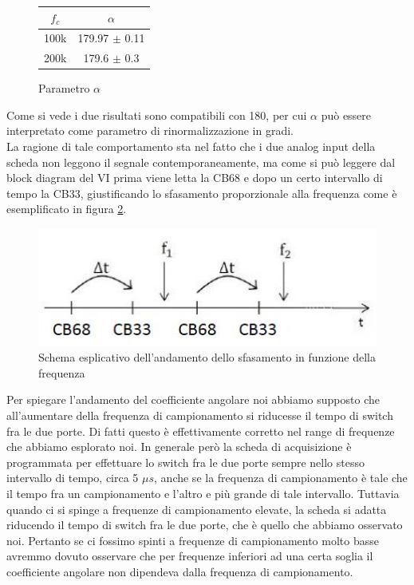 \documentclass[journal, a4paper]{IEEEtran}
\begin{document}
\begin{figure}[htp]
\centering
\caption{Parametro $\alpha$}
\begin{tabular}{|c|c|}
\hline 
$f_c$ & $\alpha$ \\ 
\hline 
100k & 179.97 $\pm$ 0.11 \\ 
\hline 
200k & 179.6 $\pm$ 0.3 \\ 
\hline 
\end{tabular} 
\label{tab:alpha}
\end{figure}

Come si vede i due risultati sono compatibili con 180, per cui $\alpha$ può essere interpretato come parametro di rinormalizzazione in gradi.\\
La ragione di tale comportamento sta nel fatto che i due analog input della scheda non leggono il segnale contemporaneamente, ma come si può leggere dal block diagram del VI prima viene letta la CB68 e dopo un certo intervallo di tempo la CB33, giustificando lo sfasamento proporzionale alla frequenza come è esemplificato in figura \ref{fig:deltat}.

\begin{figure}[htp]
\centering
\includegraphics[scale=.55]{deltat}
\caption{Schema esplicativo dell'andamento dello sfasamento in funzione della frequenza}
\label{fig:deltat}
\end{figure}

Per spiegare l'andamento del coefficiente angolare noi abbiamo supposto che all'aumentare della frequenza di campionamento si riducesse il tempo di switch fra le due porte. Di fatti questo è effettivamente corretto nel range di frequenze che abbiamo esplorato noi. In generale però la scheda di acquisizione è programmata per effettuare lo switch fra le due porte sempre nello stesso intervallo di tempo, circa 5 $\mu s$, anche se la frequenza di campionamento è tale che il tempo fra un campionamento e l'altro e più grande di tale intervallo. Tuttavia quando ci si spinge a frequenze di campionamento elevate, la scheda si adatta riducendo il tempo di switch fra le due porte, che è quello che abbiamo osservato noi. Pertanto se ci fossimo spinti a frequenze di campionamento molto basse avremmo dovuto osservare che per frequenze inferiori ad una certa soglia il coefficiente angolare non dipendeva dalla frequenza di campionamento.\\
\end{document}
